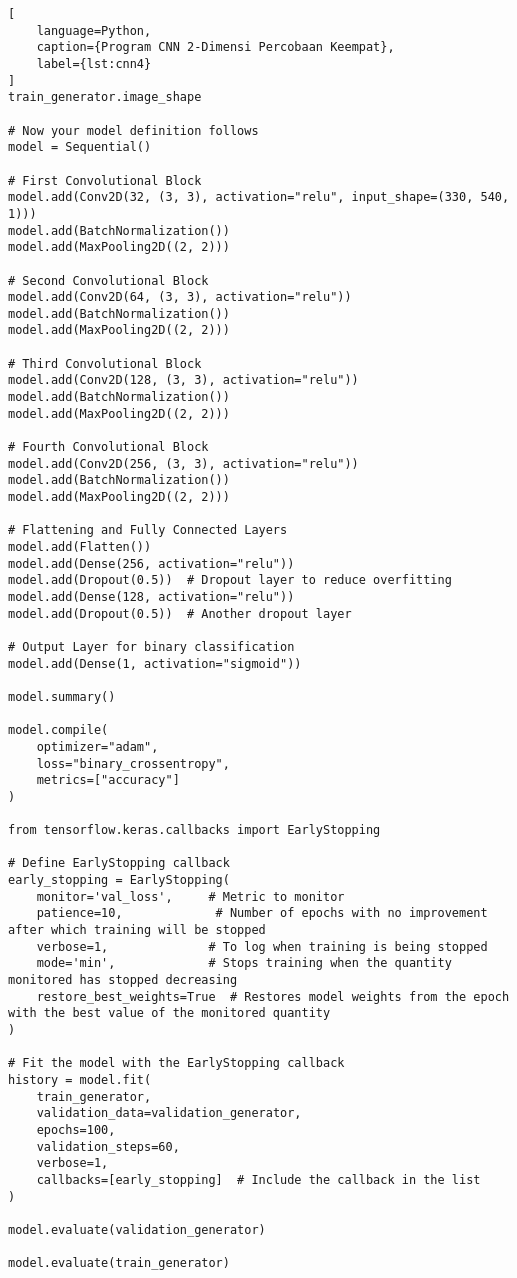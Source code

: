 \begin{lstlisting}[
    language=Python,
    caption={Program CNN 2-Dimensi Percobaan Keempat},
    label={lst:cnn4}
]
train_generator.image_shape

# Now your model definition follows
model = Sequential()

# First Convolutional Block
model.add(Conv2D(32, (3, 3), activation="relu", input_shape=(330, 540, 1)))
model.add(BatchNormalization())
model.add(MaxPooling2D((2, 2)))

# Second Convolutional Block
model.add(Conv2D(64, (3, 3), activation="relu"))
model.add(BatchNormalization())
model.add(MaxPooling2D((2, 2)))

# Third Convolutional Block
model.add(Conv2D(128, (3, 3), activation="relu"))
model.add(BatchNormalization())
model.add(MaxPooling2D((2, 2)))

# Fourth Convolutional Block
model.add(Conv2D(256, (3, 3), activation="relu"))
model.add(BatchNormalization())
model.add(MaxPooling2D((2, 2)))

# Flattening and Fully Connected Layers
model.add(Flatten())
model.add(Dense(256, activation="relu"))
model.add(Dropout(0.5))  # Dropout layer to reduce overfitting
model.add(Dense(128, activation="relu"))
model.add(Dropout(0.5))  # Another dropout layer

# Output Layer for binary classification
model.add(Dense(1, activation="sigmoid"))

model.summary()

model.compile(
    optimizer="adam",
    loss="binary_crossentropy",
    metrics=["accuracy"]
)

from tensorflow.keras.callbacks import EarlyStopping

# Define EarlyStopping callback
early_stopping = EarlyStopping(
    monitor='val_loss',     # Metric to monitor
    patience=10,             # Number of epochs with no improvement after which training will be stopped
    verbose=1,              # To log when training is being stopped
    mode='min',             # Stops training when the quantity monitored has stopped decreasing
    restore_best_weights=True  # Restores model weights from the epoch with the best value of the monitored quantity
)

# Fit the model with the EarlyStopping callback
history = model.fit(
    train_generator,
    validation_data=validation_generator,
    epochs=100,
    validation_steps=60,
    verbose=1,
    callbacks=[early_stopping]  # Include the callback in the list
)

model.evaluate(validation_generator)

model.evaluate(train_generator)


\end{lstlisting}
